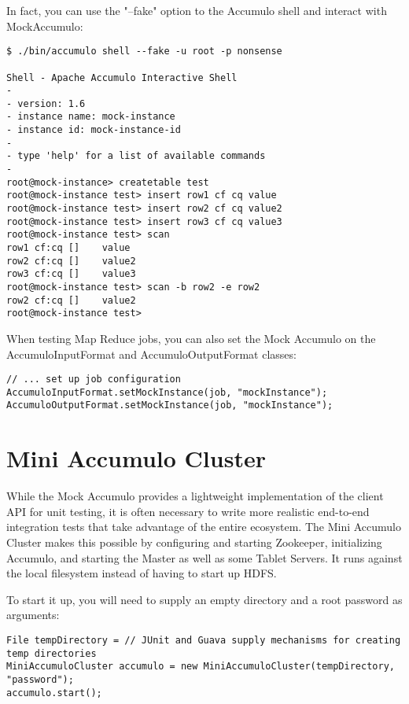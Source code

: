 In fact, you can use the "--fake" option to the Accumulo shell and interact with
MockAccumulo:

\small
\begin{verbatim}
$ ./bin/accumulo shell --fake -u root -p nonsense

Shell - Apache Accumulo Interactive Shell
-
- version: 1.6
- instance name: mock-instance
- instance id: mock-instance-id
-
- type 'help' for a list of available commands
-
root@mock-instance> createtable test
root@mock-instance test> insert row1 cf cq value
root@mock-instance test> insert row2 cf cq value2
root@mock-instance test> insert row3 cf cq value3
root@mock-instance test> scan
row1 cf:cq []    value
row2 cf:cq []    value2
row3 cf:cq []    value3
root@mock-instance test> scan -b row2 -e row2
row2 cf:cq []    value2
root@mock-instance test>
\end{verbatim}
\normalsize

When testing Map Reduce jobs, you can also set the Mock Accumulo on the AccumuloInputFormat
and AccumuloOutputFormat classes:

\small
\begin{verbatim}
// ... set up job configuration
AccumuloInputFormat.setMockInstance(job, "mockInstance");
AccumuloOutputFormat.setMockInstance(job, "mockInstance");
\end{verbatim}
\normalsize

\section{Mini Accumulo Cluster}

While the Mock Accumulo provides a lightweight implementation of the client API for unit
testing, it is often necessary to write more realistic end-to-end integration tests that
take advantage of the entire ecosystem. The Mini Accumulo Cluster makes this possible by
configuring and starting Zookeeper, initializing Accumulo, and starting the Master as well
as some Tablet Servers. It runs against the local filesystem instead of having to start
up HDFS.

To start it up, you will need to supply an empty directory and a root password as arguments:

\small
\begin{verbatim}
File tempDirectory = // JUnit and Guava supply mechanisms for creating temp directories
MiniAccumuloCluster accumulo = new MiniAccumuloCluster(tempDirectory, "password");
accumulo.start();
\end{verbatim}
\normalsize

